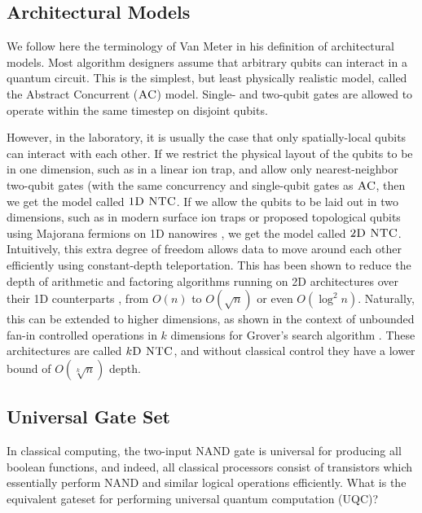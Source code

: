 \subsection{Architectural Models}

We follow here the terminology of Van Meter \cite{VanMeter2006} in his
definition of architectural models. Most algorithm designers assume
that arbitrary qubits can interact in a quantum circuit.
This is the simplest, but least
physically realistic model, called the Abstract Concurrent ($\textsc{AC}$) model.
Single- and two-qubit gates are allowed to operate within the same
timestep on disjoint qubits.

However, in the laboratory, it is usually the case that only spatially-local
qubits can interact with each other. If we restrict the physical layout of
the qubits to be in one dimension, such as in a linear ion trap, and
allow only nearest-neighbor two-qubit gates (with the same concurrency and
single-qubit gates as $\textsc{AC}$, then we get the model called
$\textsc{1D NTC}$. If we allow the qubits to be laid out in two dimensions,
such as in modern surface ion traps \cite{Blakestad2011} or
proposed topological qubits using
Majorana fermions on 1D nanowires \cite{Bonderson2010}, we get the
model called $\textsc{2D NTC}$. Intuitively, this extra degree of freedom allows
data to move around each other efficiently using constant-depth teleportation.
This has been shown to reduce the depth of arithmetic and factoring
algorithms running on 2D architectures over
their 1D counterparts \cite{Choi2010} \cite{Pham2012b}, from $O(n)$ to
$O(\sqrt{n})$ or even $O(\log^2 n)$.
Naturally, this can be extended to higher dimensions, as shown in the
context of unbounded fan-in controlled operations in $k$ dimensions for
Grover's search algorithm \cite{Rosenbaum2012}. These architectures are
called $k\textsc{D NTC}$, and without classical control they have a 
lower bound of 
$O(\sqrt[k]{n})$ depth.

\subsection{Universal Gate Set}
\label{subsec:universal}

In classical computing, the two-input NAND gate is universal for producing
all boolean functions, and indeed, all classical processors consist of
transistors which essentially perform NAND and similar logical operations
efficiently. What is the equivalent gateset for performing universal
quantum computation (\textsc{UQC})?

